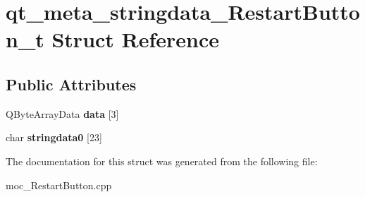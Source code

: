 \hypertarget{structqt__meta__stringdata__RestartButton__t}{}\section{qt\+\_\+meta\+\_\+stringdata\+\_\+\+Restart\+Button\+\_\+t Struct Reference}
\label{structqt__meta__stringdata__RestartButton__t}
\subsection*{Public Attributes}
\begin{DoxyCompactItemize}
\item 
Q\+Byte\+Array\+Data {\bfseries data} \mbox{[}3\mbox{]}\hypertarget{structqt__meta__stringdata__RestartButton__t_a2a95dc0143c925c0e350f27f72ae8cad}{}\label{structqt__meta__stringdata__RestartButton__t_a2a95dc0143c925c0e350f27f72ae8cad}

\item 
char {\bfseries stringdata0} \mbox{[}23\mbox{]}\hypertarget{structqt__meta__stringdata__RestartButton__t_a41d983b1baa4bcd30eea845da75c79c2}{}\label{structqt__meta__stringdata__RestartButton__t_a41d983b1baa4bcd30eea845da75c79c2}

\end{DoxyCompactItemize}


The documentation for this struct was generated from the following file\+:\begin{DoxyCompactItemize}
\item 
moc\+\_\+\+Restart\+Button.\+cpp\end{DoxyCompactItemize}
